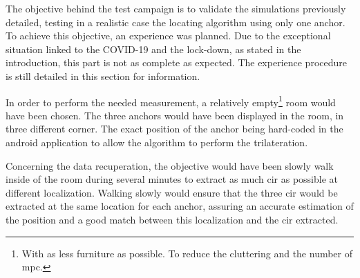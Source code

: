 The objective behind the test campaign is to validate the simulations previously detailed, testing in a realistic case the locating algorithm using only one anchor. To achieve this objective, an experience was planned. Due to the exceptional situation linked to the COVID-19 and the lock-down, as stated in the introduction, this part is not as complete as expected. The experience procedure is still detailed in this section for information.
\vspace{2mm}

In order to perform the needed measurement, a relatively empty\footnote{With as less furniture as possible. To reduce the cluttering and the number of \gls{mpc}.} room would have been chosen. The three anchors would have been displayed in the room, in three different corner. The exact position of the anchor being hard-coded in the android application to allow the algorithm to perform the trilateration.
\vspace{2mm}

Concerning the data recuperation, the objective would have been slowly walk inside of the room during several minutes to extract as much \gls{cir} as possible at different localization. Walking slowly would ensure that the three \gls{cir} would be extracted at the same location for each anchor, assuring an accurate estimation of the position and a good match between this localization and the \gls{cir} extracted.

